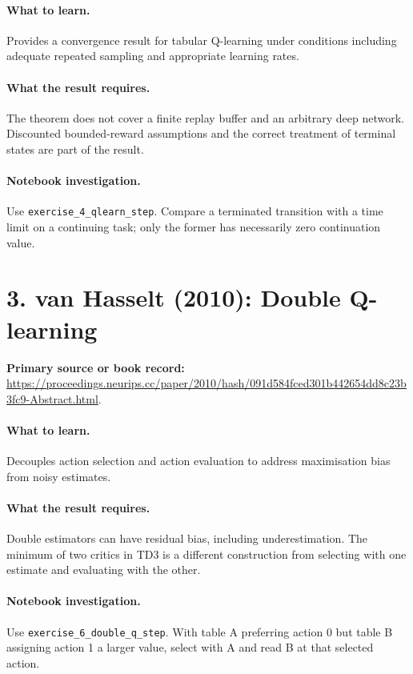 \documentclass[11pt]{scrartcl}
\begin{document}
\paragraph{What to learn.} Provides a convergence result for tabular Q-learning under conditions including adequate repeated sampling and appropriate learning rates.

\paragraph{What the result requires.} The theorem does not cover a finite replay buffer and an arbitrary deep network. Discounted bounded-reward assumptions and the correct treatment of terminal states are part of the result.

\paragraph{Notebook investigation.} Use \texttt{exercise\_4\_qlearn\_step}. Compare a terminated transition with a time limit on a continuing task; only the former has necessarily zero continuation value.

\section*{3. van Hasselt (2010): Double Q-learning}
\textbf{Primary source or book record:} \url{https://proceedings.neurips.cc/paper/2010/hash/091d584fced301b442654dd8c23b3fc9-Abstract.html}.

\paragraph{What to learn.} Decouples action selection and action evaluation to address maximisation bias from noisy estimates.

\paragraph{What the result requires.} Double estimators can have residual bias, including underestimation. The minimum of two critics in TD3 is a different construction from selecting with one estimate and evaluating with the other.

\paragraph{Notebook investigation.} Use \texttt{exercise\_6\_double\_q\_step}. With table A preferring action 0 but table B assigning action 1 a larger value, select with A and read B at that selected action.
\end{document}
